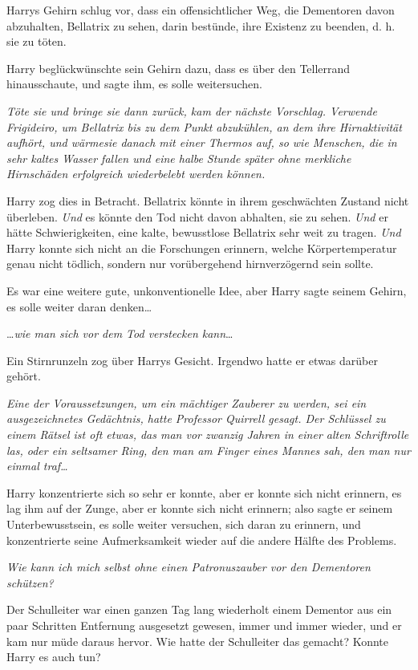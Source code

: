 {Harrys Gehirn schlug vor, dass ein offensichtlicher Weg, die Dementoren davon abzuhalten, Bellatrix zu sehen, darin bestünde, ihre Existenz zu beenden, d. h. sie zu töten.

Harry beglückwünschte sein Gehirn dazu, dass es über den Tellerrand hinausschaute, und sagte ihm, es solle weitersuchen.

\emph{\emph{Töte sie und bringe sie dann zurück,} kam der nächste Vorschlag. \emph{Verwende} \emph{Frigideiro, um Bellatrix bis zu dem Punkt abzukühlen, an dem ihre Hirnaktivität aufhört, und} \emph{wärmesie} \emph{danach mit einer} \emph{Thermos} \emph{auf, so wie Menschen, die in sehr kaltes Wasser fallen} \emph{und} \emph{eine halbe Stunde später ohne merkliche Hirnschäden erfolgreich wiederbelebt werden können.}}

Harry zog dies in Betracht. Bellatrix könnte in ihrem geschwächten Zustand nicht überleben. \emph{Und} es könnte den Tod nicht davon abhalten, sie zu sehen. \emph{Und} er hätte Schwierigkeiten, eine kalte, bewusstlose Bellatrix sehr weit zu tragen. \emph{Und} Harry konnte sich nicht an die Forschungen erinnern, welche Körpertemperatur genau nicht tödlich, sondern nur vorübergehend hirnverzögernd sein sollte.

Es war eine weitere gute, unkonventionelle Idee, aber Harry sagte seinem Gehirn, es solle weiter daran denken…

…\emph{wie man sich vor dem Tod verstecken kann}…

Ein Stirnrunzeln zog über Harrys Gesicht. Irgendwo hatte er etwas darüber gehört.

\emph{\emph{Eine der Voraussetzungen, um ein mächtiger Zauberer zu werden, sei ein ausgezeichnetes Gedächtnis,} hatte Professor Quirrell gesagt. \emph{Der Schlüssel zu einem Rätsel ist oft etwas, das man vor zwanzig Jahren in einer alten Schriftrolle las, oder ein seltsamer Ring, den man am Finger eines Mannes sah, den man nur einmal} \emph{traf…}}

Harry konzentrierte sich so sehr er konnte, aber er konnte sich nicht erinnern, es lag ihm auf der Zunge, aber er konnte sich nicht erinnern; also sagte er seinem Unterbewusstsein, es solle weiter versuchen, sich daran zu erinnern, und konzentrierte seine Aufmerksamkeit wieder auf die andere Hälfte des Problems.

\emph{\emph{Wie kann ich mich selbst ohne einen} \emph{Patronuszauber} \emph{vor den Dementoren schützen?}}

Der Schulleiter war einen ganzen Tag lang wiederholt einem Dementor aus ein paar Schritten Entfernung ausgesetzt gewesen, immer und immer wieder, und er kam nur müde daraus hervor. Wie hatte der Schulleiter das gemacht? Konnte Harry es auch tun?

}
